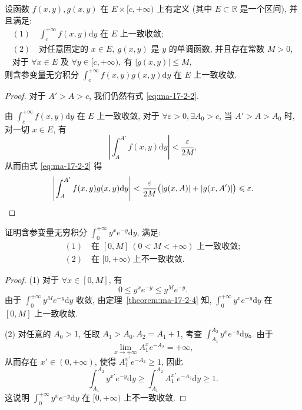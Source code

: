 \begin{theorem}[{阿贝尔判别法}]\label{theorem:ma-17-2-4}
设函数 $f(x,y),g(x,y)$ 在 $E\times[c,+\infty)$ 上有定义 (其中 $E\subset\mathbb R$ 是一个区间), 并且满足:
\[
\begin{gathered}
  (1)\quad \int_c^{+\infty}f(x,y)\mathrm dy \text{ 在 } E \text{ 上一致收敛};\\
  (2)\quad \text{对任意固定的 } x\in E,\ g(x,y) \text{ 是 } y \text{ 的单调函数, 并且存在常数 } M>0,\\
  \text{对于 } \forall x\in E \text{ 及 } \forall y\in[c,+\infty),\ \text{有 } |g(x,y)|\leqslant M,
\end{gathered}
\]
则含参变量无穷积分 $\int_c^{+\infty}f(x,y)g(x,y)\mathrm dy$ 在 $E$ 上一致收敛.
\end{theorem}


\begin{proof}
对于 $A'>A>c$, 我们仍然有式 \eqref{eq:ma-17-2-2}.

由 $\int_c^{+\infty}f(x,y)\mathrm dy$ 在 $E$ 上一致收敛, 对于 $\forall\varepsilon>0,\exists A_0>c$, 当 $A'>A>A_0$ 时, 对一切 $x\in E$, 有
\[
  \left|\int_A^{A'}f(x,y)\mathrm dy\right|<\frac{\varepsilon}{2M},
\]
从而由式 \eqref{eq:ma-17-2-2} 得
\[
  \left|\int_A^{A'}f(x,y)g(x,y)\mathrm dy\right|
  <\frac{\varepsilon}{2M}\bigl(|g(x,A)|+|g(x,A')|\bigr)\leqslant\varepsilon.
\qedhere
\]
\end{proof}


\begin{example}\label{example:ma-17-2-1}
证明含参变量无穷积分 $\int_0^{+\infty}y^xe^{-y}\mathrm dy$, 满足:
\[
\begin{gathered}
  (1)\quad \text{在 } [0,M]\ (0<M<+\infty) \text{ 上一致收敛};\\
  (2)\quad \text{在 } [0,+\infty) \text{ 上不一致收敛}.
\end{gathered}
\]
\end{example}


\begin{proof}
(1) 对于 $\forall x\in[0,M]$, 有
\[
  0\leqslant y^xe^{-y}\leqslant y^M e^{-y}.
\]
由于 $\int_0^{+\infty}y^M e^{-y}\mathrm dy$ 收敛, 由定理~\ref{theorem:ma-17-2-4} 知, $\int_0^{+\infty}y^xe^{-y}\mathrm dy$ 在 $[0,M]$ 上一致收敛.

(2) 对任意的 $A_0>1$, 任取 $A_1>A_0,A_2=A_1+1$, 考查 $\int_{A_1}^{A_2}y^xe^{-y}\mathrm dy$。由于
\[
  \lim_{x\to+\infty}A_1^x e^{-A_2}=+\infty,
\]
从而存在 $x'\in(0,+\infty)$, 使得 $A_1^{x'}e^{-A_2}\geqslant1$, 因此
\[
  \int_{A_1}^{A_2}y^{x'}e^{-y}\mathrm dy
  \geqslant \int_{A_1}^{A_2}A_1^{x'}e^{-A_2}\mathrm dy\geqslant1.
\]
这说明 $\int_0^{+\infty}y^xe^{-y}\mathrm dy$ 在 $[0,+\infty)$ 上不一致收敛.
\end{proof}


